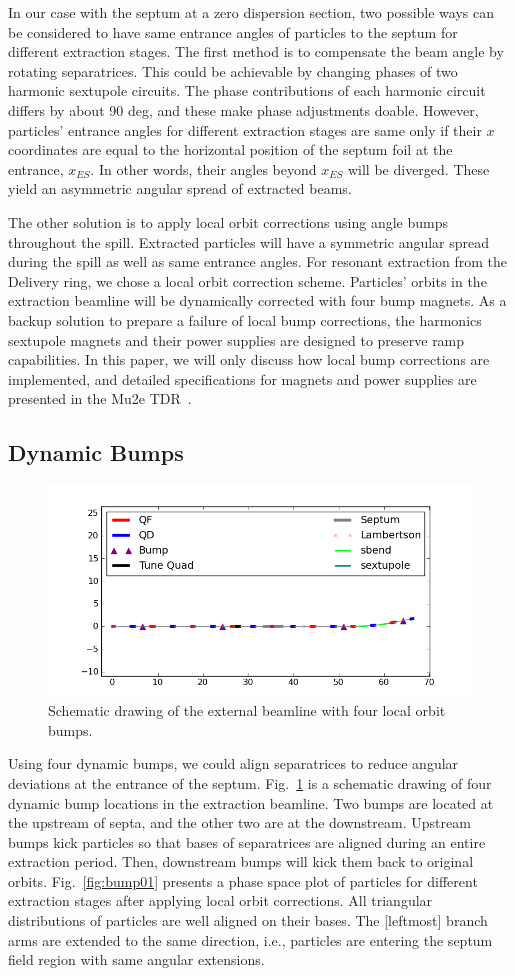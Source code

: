 \documentclass[aps,prstab,onecolumn,preprint,endfloats,11pt]{revtex4-1}
\begin{document}
In our case with the septum at a zero dispersion section, two possible ways can be considered to have same entrance angles of particles to the septum for different extraction stages.
The first method is to compensate the beam angle by rotating separatrices. This could be achievable by changing phases of two harmonic sextupole circuits.
The phase contributions of each harmonic circuit differs by about 90 deg, and these make phase adjustments doable.
However, particles' entrance angles for different extraction stages are same only if their $x$ coordinates are equal to the horizontal position of the septum foil at the entrance, $x_{ES}$.
In other words, their angles beyond $x_{ES}$ will be diverged.
These yield an asymmetric angular spread of extracted beams.

The other solution is to apply local orbit corrections using angle bumps throughout the spill.
Extracted particles will have a symmetric angular spread during the spill as well as same entrance angles.
For resonant extraction from the Delivery ring, we chose a local orbit correction scheme.
Particles' orbits in the extraction beamline will be dynamically corrected with four bump magnets.
As a backup solution to prepare a failure of local bump corrections, the harmonics sextupole magnets and their power supplies are designed to preserve ramp capabilities.
In this paper, we will only discuss how local bump corrections are implemented, and detailed specifications for magnets and power supplies are presented in the Mu2e TDR~\cite{tdr}.

\subsection{\label{sec:bump1}Dynamic Bumps}

\begin{figure}[!tbp]
  \includegraphics[width=.45\textwidth]{img/fig_bump2}
  \caption{\label{fig:bump1}Schematic drawing of the external beamline with four local orbit bumps.}
\end{figure}

Using four dynamic bumps, we could align separatrices to reduce angular deviations at the entrance of the septum.
Fig.~\ref{fig:bump1} is a schematic drawing of four dynamic bump locations in the extraction beamline.
Two bumps are located at the upstream of septa, and the other two are at the downstream.
Upstream bumps kick particles so that bases of separatrices are aligned during an entire extraction period.
Then, downstream bumps will kick them back to original orbits.
Fig.~\ref{fig:bump01} presents a phase space plot of particles for different extraction stages after applying local orbit corrections.
All triangular distributions of particles are well aligned on their bases.
The [leftmost] branch arms are extended to the same direction, i.e., particles are entering the septum field region with same angular extensions.
\end{document}

